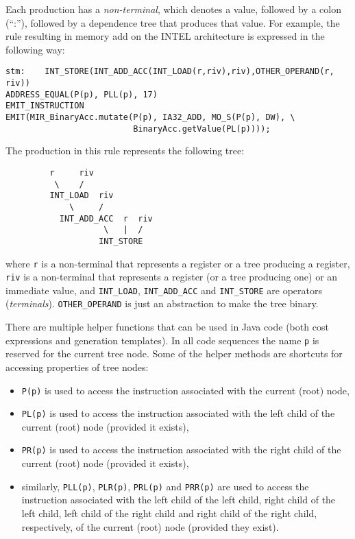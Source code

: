 Each production has a {\em non-terminal}, which denotes a value, followed
by a colon (``:''), followed by a dependence tree that produces that value.
For example, the rule resulting in memory add on the INTEL architecture is
expressed in the following way:
\begin{verbatim}
stm:    INT_STORE(INT_ADD_ACC(INT_LOAD(r,riv),riv),OTHER_OPERAND(r, riv))
ADDRESS_EQUAL(P(p), PLL(p), 17)
EMIT_INSTRUCTION
EMIT(MIR_BinaryAcc.mutate(P(p), IA32_ADD, MO_S(P(p), DW), \
                          BinaryAcc.getValue(PL(p))));
\end{verbatim}
The production in this rule represents the following tree:
\begin{verbatim}
         r     riv
          \    /
         INT_LOAD  riv
             \     /
           INT_ADD_ACC  r  riv
                    \   |  /
                   INT_STORE
\end{verbatim}
where {\tt r} is a non-terminal that represents a register or a tree
producing a register, {\tt riv} is a non-terminal that represents a register
(or a tree producing one) or an immediate value, and {\tt INT\_LOAD},
{\tt INT\_ADD\_ACC} and {\tt INT\_STORE} are operators ({\em terminals}).
{\tt OTHER\_OPERAND} is just an abstraction to make the tree binary.

There are multiple helper functions that can be used in Java code (both cost
expressions and generation templates).  In all code sequences the name
{\tt p} is reserved for the current tree node.  Some of the helper methods
are shortcuts for accessing properties of tree nodes:
\begin{itemize}
\item {\tt P(p)} is used to access the instruction associated with the
current (root) node,
\item {\tt PL(p)} is used to access the instruction associated with the left
child of the current (root) node (provided it exists),
\item {\tt PR(p)} is used to access the instruction associated with the
right child of the current (root) node (provided it exists),
\item similarly, {\tt PLL(p)}, {\tt PLR(p)}, {\tt PRL(p)} and {\tt PRR(p)}
are used to access the instruction associated with the
left child of the left child, right child of the left child, left child of
the right child and right child of the right child, respectively, of the
current (root) node (provided they exist).
\end{itemize}

